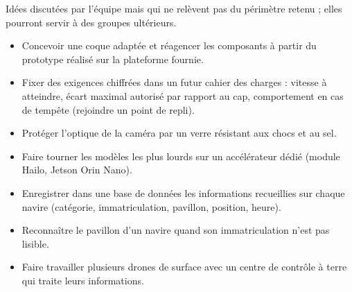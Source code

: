 \label{sec:idees}

Idées discutées par l'équipe mais qui ne relèvent pas du périmètre retenu ; elles pourront servir à des groupes ultérieurs.
\begin{itemize}
  \item Concevoir une coque adaptée et réagencer les composants à partir du prototype réalisé sur la plateforme fournie.
  \item Fixer des exigences chiffrées dans un futur cahier des charges : vitesse à atteindre, écart maximal autorisé par rapport au cap, comportement en cas de tempête (rejoindre un point de repli).
  \item Protéger l'optique de la caméra par un verre résistant aux chocs et au sel.
  \item Faire tourner les modèles les plus lourds sur un accélérateur dédié (module Hailo, Jetson Orin Nano).
  \item Enregistrer dans une base de données les informations recueillies sur chaque navire (catégorie, immatriculation, pavillon, position, heure).
  \item Reconnaître le pavillon d'un navire quand son immatriculation n'est pas lisible.
  \item Faire travailler plusieurs drones de surface avec un centre de contrôle à terre qui traite leurs informations.
\end{itemize}
